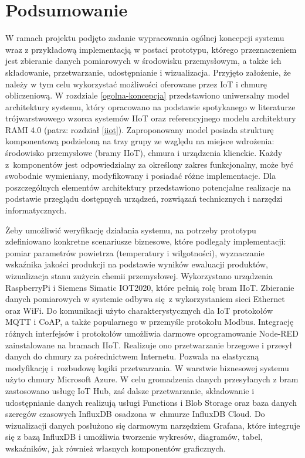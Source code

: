 \documentclass[a4paper, 12pt, twoside]{article}
\begin{document}
\section{Podsumowanie}\label{wnioski}

W ramach projektu podjęto zadanie wypracowania ogólnej koncepcji systemu
wraz z przykładową implementacją w postaci prototypu, którego przeznaczeniem jest
zbieranie danych pomiarowych w środowisku przemysłowym, a także ich składowanie, przetwarzanie,
udostępnianie i wizualizacja. Przyjęto założenie, że należy w tym celu wykorzystać możliwości
oferowane przez IoT i chmurę obliczeniową. W rozdziale \ref{ogolna-koncepcja}
przedstawiono uniwersalny model architektury systemu, który opracowano na podstawie
spotykanego w literaturze trójwarstwowego wzorca systemów IIoT oraz referencyjnego
modelu architektury RAMI 4.0 (patrz: rozdział \ref{iiot}). Zaproponowany model
posiada strukturę komponentową podzieloną na trzy grupy ze względu na miejsce wdrożenia:
środowisko przemysłowe (bramy IIoT), chmura i urządzenia klienckie.
Każdy z~komponentów jest odpowiedzialny za określony
zakres funkcjonalny, może być swobodnie wymieniany, modyfikowany i posiadać różne implementacje.
Dla poszczególnych elementów architektury przedstawiono potencjalne realizacje
na podstawie przeglądu dostępnych urządzeń, rozwiązań technicznych i  narzędzi informatycznych.

Żeby umożliwić weryfikację działania systemu,
na potrzeby prototypu zdefiniowano konkretne scenariusze biznesowe, które
podlegały implementacji: pomiar parametrów powietrza (temperatury i wilgotności),
wyznaczanie wskaźnika jakości produkcji na podstawie wyników ewaluacji produktów,
wizualizacja stanu zużycia chemii przemysłowej. Wykorzystano urządzenia
RaspberryPi i Siemens Simatic IOT2020, które pełnią rolę bram IIoT. Zbieranie
danych pomiarowych w systemie odbywa się z wykorzystaniem sieci Ethernet oraz WiFi.
Do komunikacji użyto charakterystycznych dla IoT protokołów MQTT i CoAP, a także
popularnego w przemyśle protokołu Modbus. Integrację różnych interfejsów i protokołów
umożliwia darmowe oprogramowanie Node-RED zainstalowane na bramach IIoT.
Realizuje ono przetwarzanie brzegowe i przesył danych do chmury za pośrednictwem Internetu.
Pozwala na elastyczną modyfikację i~rozbudowę logiki przetwarzania.
W warstwie biznesowej systemu użyto chmury Microsoft Azure. W celu
gromadzenia danych przesyłanych z bram zastosowano usługę IoT Hub, zaś dalsze
przetwarzanie, składowanie i udostępnianie danych realizują usługi Functions i Blob Storage
oraz baza danych szeregów czasowych InfluxDB osadzona w~chmurze InfluxDB Cloud.
Do wizualizacji danych posłużono się darmowym narzędziem Grafana, które integruje się z bazą InfluxDB i
umożliwia tworzenie wykresów, diagramów, tabel, wskaźników, jak również własnych
komponentów graficznych.
\end{document}
